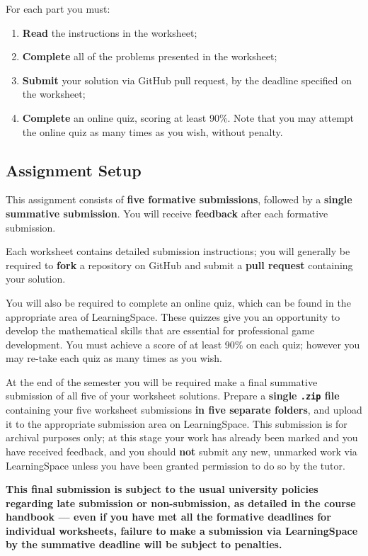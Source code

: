 \documentclass{../../fal_assignment}
\begin{document}
For each part you must:
\begin{enumerate}[label=(\roman*)]
    \item \textbf{Read} the instructions in the worksheet;
    \item \textbf{Complete} all of the problems presented in the worksheet;
    \item \textbf{Submit} your solution via GitHub pull request, by the deadline specified on the worksheet;
	\item \textbf{Complete} an online quiz, scoring at least 90\%. Note that you may attempt the online quiz as many times as you wish, without penalty.
\end{enumerate}

\subsection*{Assignment Setup}

This assignment consists of \textbf{five formative submissions}, followed by a \textbf{single summative submission}.
You will receive \textbf{feedback} after each formative submission.

Each worksheet contains detailed submission instructions; you will generally be required to \textbf{fork} a repository on GitHub and submit a \textbf{pull request} containing your solution.

You will also be required to complete an online quiz, which can be found in the appropriate area of LearningSpace.
These quizzes give you an opportunity to develop the mathematical skills that are essential for professional game development.
You must achieve a score of at least 90\% on each quiz;
however you may re-take each quiz as many times as you wish.

At the end of the semester you will be required make a final summative submission of all five of your worksheet solutions.
Prepare a \textbf{single \texttt{.zip} file} containing your five worksheet submissions \textbf{in five separate folders}, and upload it to the appropriate submission area on LearningSpace.
This submission is for archival purposes only; at this stage your work has already been marked and you have received feedback, and you should \textbf{not} submit any new, unmarked work via LearningSpace unless you have been granted permission to do so by the tutor.

\textbf{This final submission is subject to the usual university policies regarding late submission or non-submission,
as detailed in the course handbook ---
even if you have met all the formative deadlines for individual worksheets,
failure to make a submission via LearningSpace by the summative deadline will be subject to penalties.}
\end{document}
